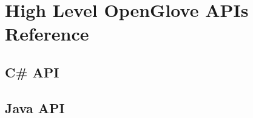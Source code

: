 \chapter{High Level OpenGlove APIs Reference}
\label{finales:anexo4}

\section{C\# API}

\section{Java API}
